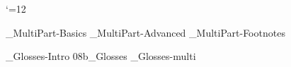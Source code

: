 



 \catcode`\@=12







%



 \bye

_MultiPart-Basics
_MultiPart-Advanced
_MultiPart-Footnotes
%
%


\bye
{}_Glosses-Intro
\get 08b_Glosses
_Glosses-multi

